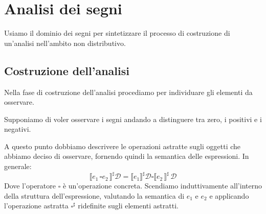 \section{Analisi dei segni}
Usiamo il dominio dei segni per sintetizzare 
il processo di costruzione di un'analisi nell'ambito
non distributivo.
\subsection{Costruzione dell'analisi}
Nella fase di costruzione dell'analisi procediamo 
per individuare gli elementi da osservare.

Supponiamo di voler osservare i segni andando a distinguere 
tra zero, i positivi e i negativi.
\begin{figure}[H]
    \centering
\end{figure}
A questo punto dobbiamo descrivere le operazioni astratte sugli 
oggetti che abbiamo deciso di osservare, fornendo quindi la semantica 
delle espressioni.
In generale:
\[
  \llbracket e_1 \,\square e_2\, \rrbracket^\sharp \mathcal{D}
  = \llbracket e_1 \rrbracket^\sharp \mathcal{D} 
  \square 
  \llbracket e_2 \,\rrbracket^\sharp\, \mathcal{D} 
\]
Dove l'operatore $\square$ è un'operazione concreta. 
Scendiamo induttivamente all'interno della struttura dell'espressione, 
valutando la semantica di $e_1$ e $e_2$ e applicando l'operazione
astratta $\square^\sharp$ ridefinite sugli elementi astratti.

